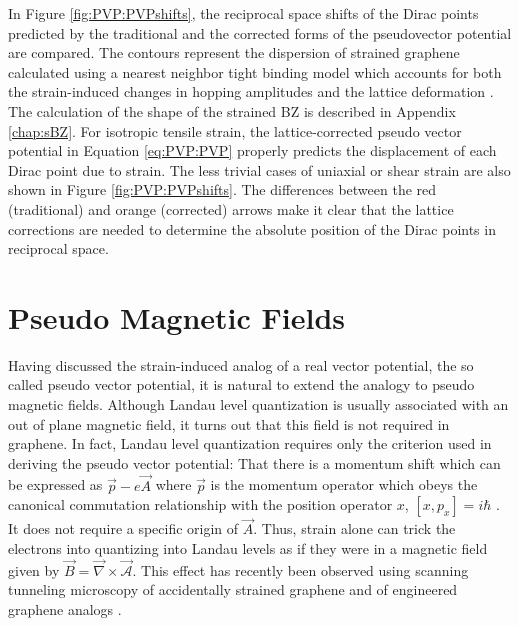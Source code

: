 In Figure \ref{fig:PVP:PVPshifts}, the reciprocal space shifts of the Dirac points predicted by the traditional and the corrected forms of the pseudovector potential are compared.
The contours represent the dispersion of strained graphene calculated using a nearest neighbor tight binding model which accounts for both the strain-induced changes in hopping amplitudes and the lattice deformation \cite{Pereira2009}.
The calculation of the shape of the strained BZ is described in Appendix \ref{chap:sBZ}.
For isotropic tensile strain, the lattice-corrected pseudo vector potential in Equation \ref{eq:PVP:PVP} properly predicts the displacement of each Dirac point due to strain.
The less trivial cases of uniaxial or shear strain are also shown in Figure \ref{fig:PVP:PVPshifts}.
The differences between the red (traditional) and orange (corrected) arrows make it clear that the lattice corrections are needed to determine the absolute position of the Dirac points in reciprocal space.

\section{Pseudo Magnetic Fields}
Having discussed the strain-induced analog of a real vector potential, the so called pseudo vector potential, it is natural to extend the analogy to pseudo magnetic fields.
Although Landau level quantization is usually associated with an out of plane magnetic field, it turns out that this field is not required in graphene.
In fact, Landau level quantization requires only the criterion used in deriving the pseudo vector potential: That there is a momentum shift which can be expressed as $\vec{p}-e\vec{A}$ where $\vec{p}$ is the momentum operator which obeys the canonical commutation relationship with the position operator $x$, $[x,p_x]=i \hbar$ \cite{Goerbig2011}.
It does not require a specific origin of $\vec{A}$.
Thus, strain alone can trick the electrons into quantizing into Landau levels as if they were in a magnetic field given by $\vec{B}=\vec{\nabla}\times\vec{\mathcal{A}}$.
This effect has recently been observed using scanning tunneling microscopy of accidentally strained graphene \cite{Levy2010,Yan2012,Yeh2011} and of engineered graphene analogs \cite{Gomes2012}.

